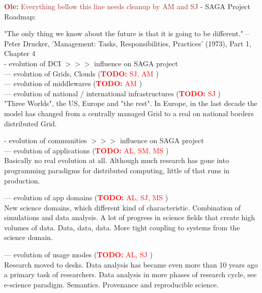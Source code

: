 \documentclass{article}
\newcommand{\B}[1]{\textbf{#1}}
\newcommand{\nind}{\noindent}
\newcommand{\todo}[1]{{\textcolor{red}{\B{TODO:} #1 }}}
\newcommand{\ownote}[1]{{\textcolor{Brown}{   \B{Ole:     } #1 }}}
\newcommand{\ownote}[1]{}
\begin{document}
\ownote{Everything bellow this line needs cleanup by AM and SJ}
 - SAGA Project Roadmap:\\

 
 \nind

 "The only thing we know about the future is that it is going to be
 different." -- Peter Drucker, 'Management: Tasks,
 Responsibilities, Practices' (1973), Part 1, Chapter 4\\ 


 - evolution of DCI $>>>$ influence on SAGA project\\
 --- evolution of Grids, Clouds (\todo{SJ, AM})\\
 --- evolution of middlewares (\todo{AM})\\
 --- evolution of national / international infrastructures (\todo{SJ})\\

"Three Worlds", the US, Europe and "the rest".
In Europe, in the last decade the model has changed from a centrally managed Grid to a real on national borders distributed Grid.

 
 \nind
 - evolution of communities  $>>>$ influence on SAGA project\\
 --- evolution of applications (\todo{AL, SM, MS})\\
 
Basically no real evolution at all. Although much research has gone into programming paradigms for distributed computing, little of that runs in production.
 
 --- evolution of app domains (\todo{AL, SJ, MS})\\
 
 New science domains, which different kind of characteristic.
 Combination of simulations and data analysis. A lot of progress in science fields that create high volumes of data.
Data, data, data.
More tight coupling to systems from the science domain.
 
 --- evolution of usage modes (\todo{AL, SJ})\\
 
 Research moved to desks. Data analysis has became even more than 10 years ago a primary task of researchers.
 Data analysis in more phases of research cycle, see e-science paradigm.
Semantics.
Provenance and reproducible science.
  
\end{document}
